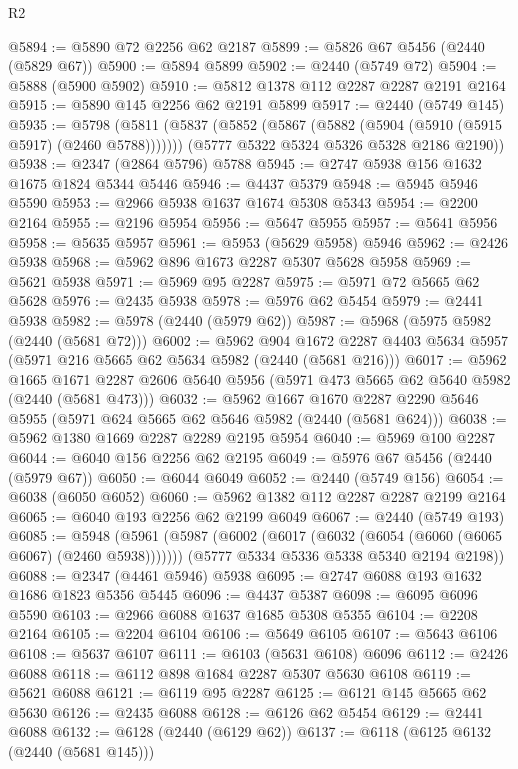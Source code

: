 \begin{lexlean}{R2}
\begin{coremodule}
@5894 := @5890 @72 @2256 @62 @2187
@5899 := @5826 @67 @5456 (@2440 (@5829 @67))
@5900 := @5894 @5899
@5902 := @2440 (@5749 @72)
@5904 := @5888 (@5900 @5902)
@5910 := @5812 @1378 @112 @2287 @2287 @2191 @2164
@5915 := @5890 @145 @2256 @62 @2191 @5899
@5917 := @2440 (@5749 @145)
@5935 := @5798
    (@5811
      (@5837 (@5852 (@5867 (@5882 (@5904 (@5910 (@5915 @5917) (@2460 @5788)))))))
      (@5777 @5322 @5324 @5326 @5328 @2186 @2190))
@5938 := @2347 (@2864 @5796) @5788
@5945 := @2747 @5938 @156 @1632 @1675 @1824 @5344 @5446
@5946 := @4437 @5379
@5948 := @5945 @5946 @5590
@5953 := @2966 @5938 @1637 @1674 @5308 @5343
@5954 := @2200 @2164
@5955 := @2196 @5954
@5956 := @5647 @5955
@5957 := @5641 @5956
@5958 := @5635 @5957
@5961 := @5953 (@5629 @5958) @5946
@5962 := @2426 @5938
@5968 := @5962 @896 @1673 @2287 @5307 @5628 @5958
@5969 := @5621 @5938
@5971 := @5969 @95 @2287
@5975 := @5971 @72 @5665 @62 @5628
@5976 := @2435 @5938
@5978 := @5976 @62 @5454
@5979 := @2441 @5938
@5982 := @5978 (@2440 (@5979 @62))
@5987 := @5968 (@5975 @5982 (@2440 (@5681 @72)))
@6002 := @5962
    @904
    @1672
    @2287
    @4403
    @5634
    @5957
    (@5971 @216 @5665 @62 @5634 @5982 (@2440 (@5681 @216)))
@6017 := @5962
    @1665
    @1671
    @2287
    @2606
    @5640
    @5956
    (@5971 @473 @5665 @62 @5640 @5982 (@2440 (@5681 @473)))
@6032 := @5962
    @1667
    @1670
    @2287
    @2290
    @5646
    @5955
    (@5971 @624 @5665 @62 @5646 @5982 (@2440 (@5681 @624)))
@6038 := @5962 @1380 @1669 @2287 @2289 @2195 @5954
@6040 := @5969 @100 @2287
@6044 := @6040 @156 @2256 @62 @2195
@6049 := @5976 @67 @5456 (@2440 (@5979 @67))
@6050 := @6044 @6049
@6052 := @2440 (@5749 @156)
@6054 := @6038 (@6050 @6052)
@6060 := @5962 @1382 @112 @2287 @2287 @2199 @2164
@6065 := @6040 @193 @2256 @62 @2199 @6049
@6067 := @2440 (@5749 @193)
@6085 := @5948
    (@5961
      (@5987 (@6002 (@6017 (@6032 (@6054 (@6060 (@6065 @6067) (@2460 @5938)))))))
      (@5777 @5334 @5336 @5338 @5340 @2194 @2198))
@6088 := @2347 (@4461 @5946) @5938
@6095 := @2747 @6088 @193 @1632 @1686 @1823 @5356 @5445
@6096 := @4437 @5387
@6098 := @6095 @6096 @5590
@6103 := @2966 @6088 @1637 @1685 @5308 @5355
@6104 := @2208 @2164
@6105 := @2204 @6104
@6106 := @5649 @6105
@6107 := @5643 @6106
@6108 := @5637 @6107
@6111 := @6103 (@5631 @6108) @6096
@6112 := @2426 @6088
@6118 := @6112 @898 @1684 @2287 @5307 @5630 @6108
@6119 := @5621 @6088
@6121 := @6119 @95 @2287
@6125 := @6121 @145 @5665 @62 @5630
@6126 := @2435 @6088
@6128 := @6126 @62 @5454
@6129 := @2441 @6088
@6132 := @6128 (@2440 (@6129 @62))
@6137 := @6118 (@6125 @6132 (@2440 (@5681 @145)))

\end{coremodule}
\end{lexlean}
